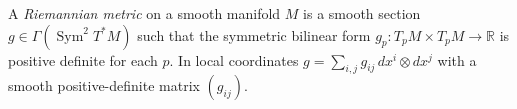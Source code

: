 
A \emph{Riemannian metric} on a smooth manifold $M$ is a smooth section $g\in\Gamma(\operatorname{Sym}^2T^*M)$ such that the symmetric bilinear form $g_p:T_pM\times T_pM\to\mathbb R$ is positive definite for each $p$. In local coordinates $g=\sum_{i,j}g_{ij}\,dx^i\otimes dx^j$ with a smooth positive-definite matrix $(g_{ij})$.
